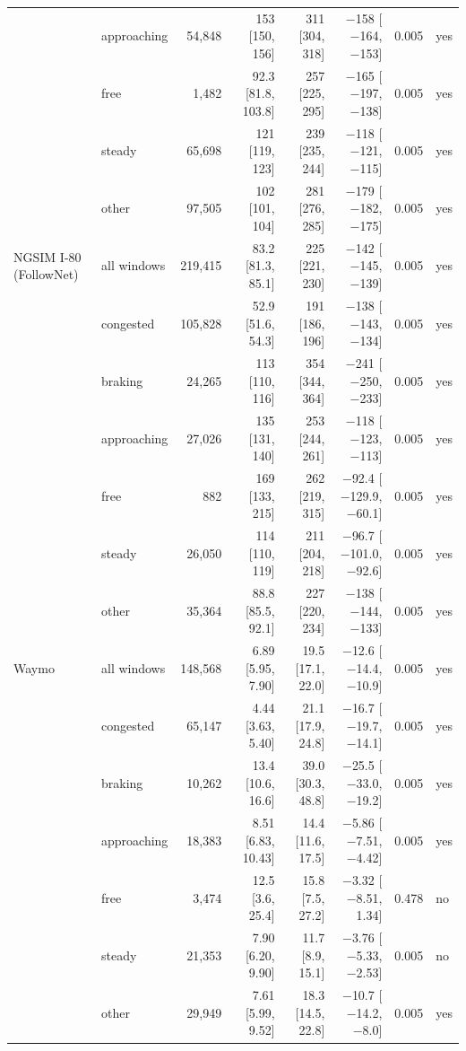 \begin{longtable}{llrrrrrl}
 & approaching & 54,848 & 153 [150, 156] & 311 [304, 318] & $-$158 [$-$164, $-$153] & 0.005 & yes \\
 & free & 1,482 & 92.3 [81.8, 103.8] & 257 [225, 295] & $-$165 [$-$197, $-$138] & 0.005 & yes \\
 & steady & 65,698 & 121 [119, 123] & 239 [235, 244] & $-$118 [$-$121, $-$115] & 0.005 & yes \\
 & other & 97,505 & 102 [101, 104] & 281 [276, 285] & $-$179 [$-$182, $-$175] & 0.005 & yes \\
\midrule
NGSIM I-80 (FollowNet) & all windows & 219,415 & 83.2 [81.3, 85.1] & 225 [221, 230] & $-$142 [$-$145, $-$139] & 0.005 & yes \\
 & congested & 105,828 & 52.9 [51.6, 54.3] & 191 [186, 196] & $-$138 [$-$143, $-$134] & 0.005 & yes \\
 & braking & 24,265 & 113 [110, 116] & 354 [344, 364] & $-$241 [$-$250, $-$233] & 0.005 & yes \\
 & approaching & 27,026 & 135 [131, 140] & 253 [244, 261] & $-$118 [$-$123, $-$113] & 0.005 & yes \\
 & free & 882 & 169 [133, 215] & 262 [219, 315] & $-$92.4 [$-$129.9, $-$60.1] & 0.005 & yes \\
 & steady & 26,050 & 114 [110, 119] & 211 [204, 218] & $-$96.7 [$-$101.0, $-$92.6] & 0.005 & yes \\
 & other & 35,364 & 88.8 [85.5, 92.1] & 227 [220, 234] & $-$138 [$-$144, $-$133] & 0.005 & yes \\
\midrule
Waymo & all windows & 148,568 & 6.89 [5.95, 7.90] & 19.5 [17.1, 22.0] & $-$12.6 [$-$14.4, $-$10.9] & 0.005 & yes \\
 & congested & 65,147 & 4.44 [3.63, 5.40] & 21.1 [17.9, 24.8] & $-$16.7 [$-$19.7, $-$14.1] & 0.005 & yes \\
 & braking & 10,262 & 13.4 [10.6, 16.6] & 39.0 [30.3, 48.8] & $-$25.5 [$-$33.0, $-$19.2] & 0.005 & yes \\
 & approaching & 18,383 & 8.51 [6.83, 10.43] & 14.4 [11.6, 17.5] & $-$5.86 [$-$7.51, $-$4.42] & 0.005 & yes \\
 & free & 3,474 & 12.5 [3.6, 25.4] & 15.8 [7.5, 27.2] & $-$3.32 [$-$8.51, 1.34] & 0.478 & no \\
 & steady & 21,353 & 7.90 [6.20, 9.90] & 11.7 [8.9, 15.1] & $-$3.76 [$-$5.33, $-$2.53] & 0.005 & no \\
 & other & 29,949 & 7.61 [5.99, 9.52] & 18.3 [14.5, 22.8] & $-$10.7 [$-$14.2, $-$8.0] & 0.005 & yes \\
\midrule

\end{longtable}
